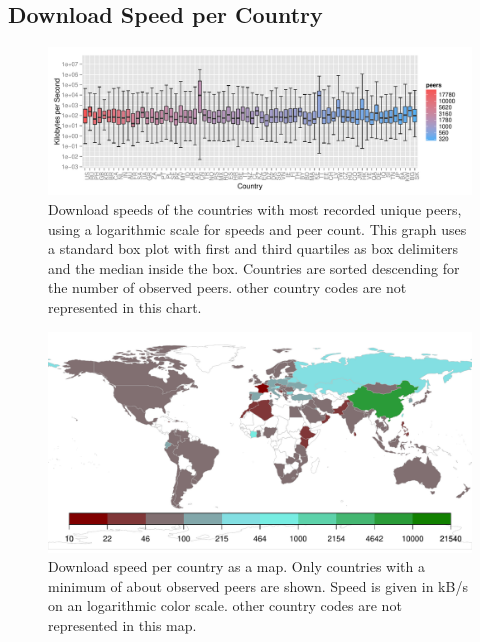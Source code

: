 \documentclass[10pt, a4paper, twoside=false, headsepline]{scrbook}
\renewcommand{\_}{\origunderscore\allowbreak}
\begin{document}
\subsection{Download Speed per Country}
\begin{figure}
\centering
\includegraphics[width=\textwidth]{../result/2015-08-30_20-combined_speed_plot}
\caption[Download speed per country as box plot]{Download speeds of the  countries with most recorded unique peers, using a logarithmic scale for speeds and peer count. This graph uses a standard box plot with first and third quartiles as box delimiters and the median inside the box. Countries are sorted descending for the number of observed peers.  other country codes are not represented in this chart.}
\label{speed-boxes}
\end{figure}

\begin{figure}
\centering
\includegraphics[width=\textwidth]{../result/2015-08-30_20-combined_speed_map}
\caption[Download speed per country as map]{Download speed per country as a map. Only countries with a minimum of about  observed peers are shown. Speed is given in kB/s on an logarithmic color scale.  other country codes are not represented in this map.}
\label{speed-map}
\end{figure}
\end{document}
